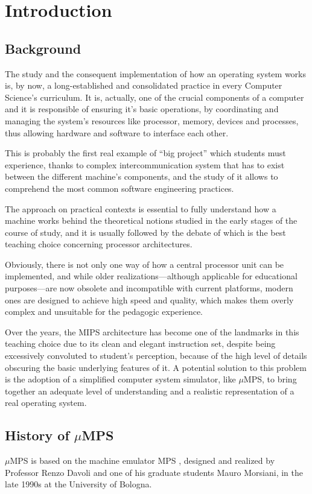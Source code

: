 \documentclass[12pt,a4paper,openright,twoside]{report}
\begin{document}
\chapter{Introduction}
\lhead[\fancyplain{}{\bfseries\thepage}]{\fancyplain{}{\bfseries\rightmark}}

\section{Background}
	The study and the consequent implementation of how an operating system works is, by now, a long-established and consolidated practice in every Computer Science's curriculum.
	It is, actually, one of the crucial components of a computer and it is responsible of ensuring it's basic operations, by coordinating and managing the system's resources like processor, memory, devices and processes, thus allowing hardware and software to interface each other.
	
	This is probably the first real example of ``big project'' which students must experience, thanks to complex intercommunication system that has to exist between the different machine's components, and the study of it allows to comprehend the most common software engineering practices.
	
	The approach on practical contexts is essential to fully understand how a machine works behind the theoretical notions studied in the early stages of the course of study, and it is usually followed by the debate of which is the best teaching choice concerning processor architectures.
	
	Obviously, there is not only one way of how a central processor unit can be implemented, and while older realizations---although applicable for educational purposes---are now obsolete and incompatible with current platforms, modern ones are designed to achieve high speed and quality, which makes them overly complex and unsuitable for the pedagogic experience.
	
	Over the years, the MIPS architecture has become one of the landmarks in this teaching choice due to its clean and elegant instruction set, despite being excessively convoluted to student’s perception, because of the high level of details obscuring the basic underlying features of it.
	A potential solution to this problem is the adoption of a simplified computer system simulator, like $\mu$MPS, to bring together an adequate level of understanding and a realistic representation of a real operating system.

\section{History of $\mu$MPS}
	$\mu$MPS is based on the machine emulator MPS \cite{mps}, designed and realized by Professor Renzo Davoli and one of his graduate students Mauro Morsiani, in the late 1990s at the University of Bologna.
	
\end{document}
